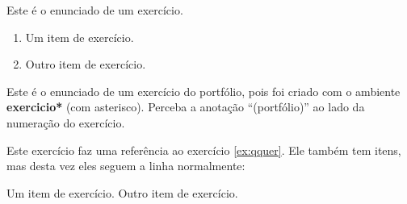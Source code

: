 \documentclass[a4paper]{article}
\newcommand\code[1]{\textbf{#1}}
\begin{document}
  
  
  
  
  
  
  
  
  \begin{exercicio}
    Este é o enunciado de um exercício.
    \begin{enumerate}
      \item Um item de exercício.
      \item Outro item de exercício.
    \end{enumerate}
  \end{exercicio}

  
  
  \begin{exercicio*}\label{ex:qquer}%
    Este é o enunciado de um exercício do portfólio, pois foi criado com o ambiente \code{exercicio*} (com asterisco).
    Perceba a anotação ``(portfólio)'' ao lado da numeração do exercício.
  \end{exercicio*}

  
  
  \begin{exercicio}
    Este exercício faz uma referência ao exercício \ref{ex:qquer}.
    Ele também tem itens, mas desta vez eles seguem a linha normalmente:%
    \begin{inlineenum}
      \inlineitem Um item de exercício.
      \inlineitem Outro item de exercício.
    \end{inlineenum}

  \end{exercicio}

  
  
  
  
  
  
  
  
\end{document}
